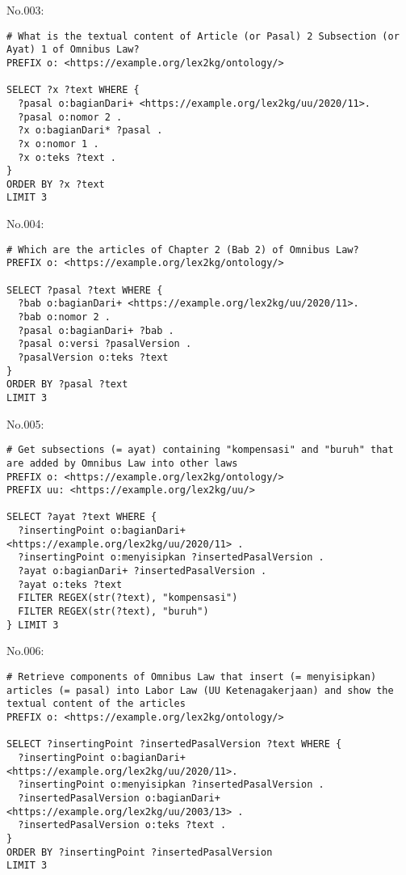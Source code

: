 \noindent No.003:
\begin{lstlisting}
# What is the textual content of Article (or Pasal) 2 Subsection (or Ayat) 1 of Omnibus Law?
PREFIX o: <https://example.org/lex2kg/ontology/>

SELECT ?x ?text WHERE {
  ?pasal o:bagianDari+ <https://example.org/lex2kg/uu/2020/11>.
  ?pasal o:nomor 2 .
  ?x o:bagianDari* ?pasal .
  ?x o:nomor 1 .
  ?x o:teks ?text .
}
ORDER BY ?x ?text
LIMIT 3
\end{lstlisting}


\noindent No.004:
\begin{lstlisting}
# Which are the articles of Chapter 2 (Bab 2) of Omnibus Law?
PREFIX o: <https://example.org/lex2kg/ontology/>

SELECT ?pasal ?text WHERE {
  ?bab o:bagianDari+ <https://example.org/lex2kg/uu/2020/11>.
  ?bab o:nomor 2 .
  ?pasal o:bagianDari+ ?bab .
  ?pasal o:versi ?pasalVersion .
  ?pasalVersion o:teks ?text
} 
ORDER BY ?pasal ?text
LIMIT 3
\end{lstlisting}


\noindent No.005:
\begin{lstlisting}
# Get subsections (= ayat) containing "kompensasi" and "buruh" that are added by Omnibus Law into other laws
PREFIX o: <https://example.org/lex2kg/ontology/>
PREFIX uu: <https://example.org/lex2kg/uu/>

SELECT ?ayat ?text WHERE {
  ?insertingPoint o:bagianDari+ <https://example.org/lex2kg/uu/2020/11> .
  ?insertingPoint o:menyisipkan ?insertedPasalVersion .
  ?ayat o:bagianDari+ ?insertedPasalVersion .
  ?ayat o:teks ?text
  FILTER REGEX(str(?text), "kompensasi")
  FILTER REGEX(str(?text), "buruh")
} LIMIT 3
\end{lstlisting}


\noindent No.006:
\begin{lstlisting}
# Retrieve components of Omnibus Law that insert (= menyisipkan) articles (= pasal) into Labor Law (UU Ketenagakerjaan) and show the textual content of the articles
PREFIX o: <https://example.org/lex2kg/ontology/>

SELECT ?insertingPoint ?insertedPasalVersion ?text WHERE {
  ?insertingPoint o:bagianDari+ <https://example.org/lex2kg/uu/2020/11>.
  ?insertingPoint o:menyisipkan ?insertedPasalVersion .
  ?insertedPasalVersion o:bagianDari+ <https://example.org/lex2kg/uu/2003/13> .
  ?insertedPasalVersion o:teks ?text .
}
ORDER BY ?insertingPoint ?insertedPasalVersion
LIMIT 3

\end{lstlisting}


